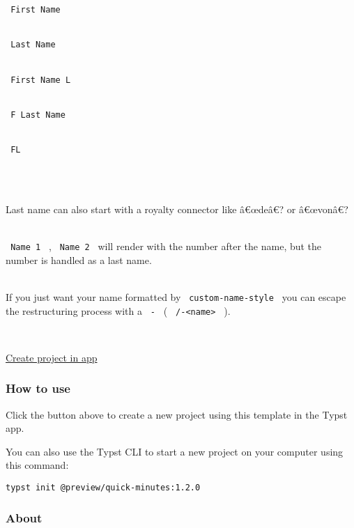 \begin{longtable}[]
\begin{minipage}[t]{\linewidth}
\texttt{\ First\ Name\ }\strut \\
\texttt{\ Last\ Name\ }\strut \\
\texttt{\ First\ Name\ L\ }\strut \\
\texttt{\ F\ Last\ Name\ }\strut \\
\texttt{\ FL\ }\strut \\
\strut \\
Last name can also start with a royalty connector like â€œdeâ€? or
â€œvonâ€?\\
\strut \\
\texttt{\ Name\ 1\ } , \texttt{\ Name\ 2\ } will render with the number
after the name, but the number is handled as a last name.\\
\strut \\
If you just want your name formatted by \texttt{\ custom-name-style\ }
you can escape the restructuring process with a \texttt{\ -\ } (
\texttt{\ /-\textless{}name\textgreater{}\ } ).\strut
\end{minipage} \\
\end{longtable}

\href{/app?template=quick-minutes&version=1.2.0}{Create project in app}

\subsubsection{How to use}\label{how-to-use}

Click the button above to create a new project using this template in
the Typst app.

You can also use the Typst CLI to start a new project on your computer
using this command:

\begin{verbatim}
typst init @preview/quick-minutes:1.2.0
\end{verbatim}



\subsubsection{About}\label{about}

